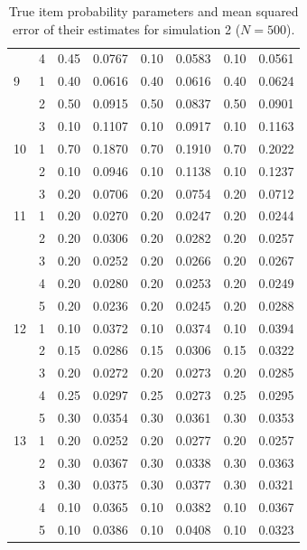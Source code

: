 \begin{table}[H]
\begin{tabular}{llcccccc}
   & 4 & 0.45 & 0.0767 & 0.10 & 0.0583 & 0.10 & 0.0561 \\ 
  9 & 1 & 0.40 & 0.0616 & 0.40 & 0.0616 & 0.40 & 0.0624 \\ 
   & 2 & 0.50 & 0.0915 & 0.50 & 0.0837 & 0.50 & 0.0901 \\ 
   & 3 & 0.10 & 0.1107 & 0.10 & 0.0917 & 0.10 & 0.1163 \\ 
  10 & 1 & 0.70 & 0.1870 & 0.70 & 0.1910 & 0.70 & 0.2022 \\ 
   & 2 & 0.10 & 0.0946 & 0.10 & 0.1138 & 0.10 & 0.1237 \\ 
   & 3 & 0.20 & 0.0706 & 0.20 & 0.0754 & 0.20 & 0.0712 \\ 
  11 & 1 & 0.20 & 0.0270 & 0.20 & 0.0247 & 0.20 & 0.0244 \\ 
   & 2 & 0.20 & 0.0306 & 0.20 & 0.0282 & 0.20 & 0.0257 \\ 
   & 3 & 0.20 & 0.0252 & 0.20 & 0.0266 & 0.20 & 0.0267 \\ 
   & 4 & 0.20 & 0.0280 & 0.20 & 0.0253 & 0.20 & 0.0249 \\ 
   & 5 & 0.20 & 0.0236 & 0.20 & 0.0245 & 0.20 & 0.0288 \\ 
  12 & 1 & 0.10 & 0.0372 & 0.10 & 0.0374 & 0.10 & 0.0394 \\ 
   & 2 & 0.15 & 0.0286 & 0.15 & 0.0306 & 0.15 & 0.0322 \\ 
   & 3 & 0.20 & 0.0272 & 0.20 & 0.0273 & 0.20 & 0.0285 \\ 
   & 4 & 0.25 & 0.0297 & 0.25 & 0.0273 & 0.25 & 0.0295 \\ 
   & 5 & 0.30 & 0.0354 & 0.30 & 0.0361 & 0.30 & 0.0353 \\ 
  13 & 1 & 0.20 & 0.0252 & 0.20 & 0.0277 & 0.20 & 0.0257 \\ 
   & 2 & 0.30 & 0.0367 & 0.30 & 0.0338 & 0.30 & 0.0363 \\ 
   & 3 & 0.30 & 0.0375 & 0.30 & 0.0377 & 0.30 & 0.0321 \\ 
   & 4 & 0.10 & 0.0365 & 0.10 & 0.0382 & 0.10 & 0.0367 \\ 
   & 5 & 0.10 & 0.0386 & 0.10 & 0.0408 & 0.10 & 0.0323 \\ 
   \bottomrule
\end{tabular}
\caption{True item probability parameters and mean squared error of their estimates for simulation 2 ($N = 500$).} 
\label{table:sim2_item_prob_mse_N500}
\end{table}
